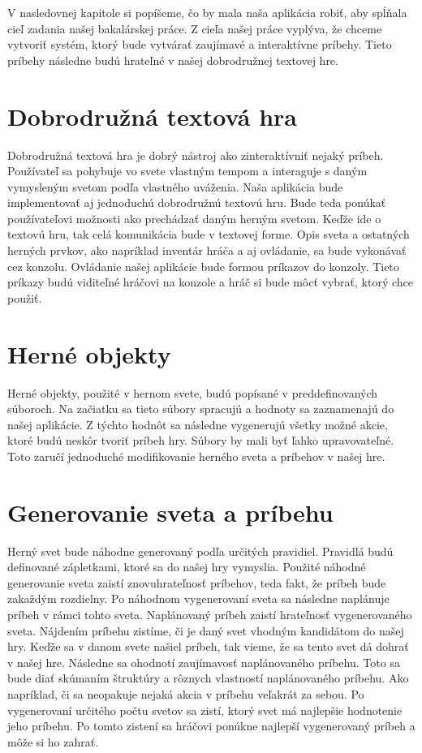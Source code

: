 V nasledovnej kapitole si popíšeme, čo by mala naša aplikácia robiť, aby spĺňala cieľ zadania našej bakalárskej práce. Z cieľa našej práce vyplýva, že chceme vytvoriť systém, ktorý bude vytvárať zaujímavé a interaktívne príbehy. Tieto príbehy následne budú hrateľné v našej dobrodružnej textovej hre.\par
\section{Dobrodružná textová hra}
Dobrodružná textová hra je dobrý nástroj ako zinteraktívniť nejaký príbeh. Používateľ sa pohybuje vo svete vlastným tempom a interaguje s daným vymysleným svetom podľa vlastného uváženia. Naša aplikácia bude implementovať aj jednoduchú dobrodružnú textovú hru. Bude teda ponúkať používateľovi možnosti ako prechádzať daným herným svetom. Keďže ide o textovú hru, tak celá komunikácia bude v textovej forme. Opis sveta a ostatných herných prvkov, ako napríklad inventár hráča a aj ovládanie, sa bude vykonávať cez konzolu. Ovládanie našej aplikácie bude formou príkazov do konzoly. Tieto príkazy budú viditeľné hráčovi na konzole a hráč si bude môcť vybrať, ktorý chce použiť.\par
\section{Herné objekty}
Herné objekty, použité v hernom svete, budú popísané v preddefinovaných súboroch. Na začiatku sa tieto súbory spracujú a hodnoty sa zaznamenajú do našej aplikácie. Z týchto hodnôt sa následne vygenerujú všetky možné akcie, ktoré budú neskôr tvoriť príbeh hry. Súbory by mali byť ľahko upravovateľné. Toto zaručí jednoduché modifikovanie herného sveta a príbehov v našej hre.\par
\section{Generovanie sveta a príbehu}
Herný svet bude náhodne generovaný podľa určitých pravidiel. Pravidlá budú definované zápletkami, ktoré sa do našej hry vymyslia. Použité náhodné generovanie sveta zaistí znovuhrateľnosť príbehov, teda fakt, že príbeh bude zakaždým rozdielny. Po náhodnom vygenerovaní sveta sa následne naplánuje príbeh v rámci tohto sveta. Naplánovaný príbeh zaistí hrateľnosť vygenerovaného sveta. Nájdením príbehu zistíme, či je daný svet vhodným kandidátom do našej hry. Keďže sa v danom svete našiel príbeh, tak vieme, že sa tento svet dá dohrať v našej hre. Následne sa ohodnotí zaujímavosť naplánovaného príbehu. Toto sa bude diať skúmaním štruktúry a rôznych vlastností naplánovaného príbehu. Ako napríklad, či sa neopakuje nejaká akcia v príbehu veľakrát za sebou. Po vygenerovaní určitého počtu svetov sa zistí, ktorý svet má najlepšie hodnotenie jeho príbehu. Po tomto zistení sa hráčovi ponúkne najlepší vygenerovaný príbeh a môže si ho zahrať.\par
